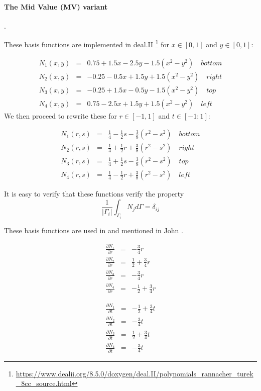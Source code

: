 \paragraph{The Mid Value (MV) variant}. 

These basis functions are implemented in deal.II
\footnote{\url{https://www.dealii.org/8.5.0/doxygen/deal.II/polynomials_rannacher_turek_8cc_source.html}}
for $x\in[0,1]$ and $y\in[0,1]$:

\begin{eqnarray}
N_1(x,y) &=&  0.75 + 1.5x - 2.5y -1.5(x^2-y^2) \quad bottom\\
N_2(x,y) &=& -0.25 - 0.5x + 1.5y +1.5(x^2-y^2) \quad right\\
N_3(x,y) &=& -0.25 + 1.5x - 0.5y -1.5(x^2-y^2) \quad top\\
N_4(x,y) &=&  0.75 - 2.5x + 1.5y +1.5(x^2-y^2) \quad left
\end{eqnarray}
We then proceed to rewrite these for $r\in[-1,1]$ and $t\in[-1:1]$:
\begin{mdframed}[backgroundcolor=blue!5]
\begin{eqnarray}
N_1(r,s) &=& \frac{1}{4} -\frac{1}{2}s - \frac{3}{8}(r^2-s^2) \quad bottom \\
N_2(r,s) &=& \frac{1}{4} +\frac{1}{2}r + \frac{3}{8}(r^2-s^2) \quad right \\
N_3(r,s) &=& \frac{1}{4} +\frac{1}{2}s - \frac{3}{8}(r^2-s^2) \quad top \\
N_4(r,s) &=& \frac{1}{4} -\frac{1}{2}r + \frac{3}{8}(r^2-s^2) \quad left
\end{eqnarray}
\end{mdframed}
It is easy to verify that these functions verify the property
\[
\frac{1}{|\Gamma_i|} \int_{\Gamma_i} N_j d\Gamma = \delta_{ij}
\]

These basis functions are used in \cite{shzh06} and mentioned in John \cite[p.722]{john16}.

\begin{eqnarray}
\frac{\partial N_1}{\partial r} &=& -\frac{3}{4}r \nonumber\\
\frac{\partial N_2}{\partial r} &=& \frac{1}{2}+\frac{3}{4}r \nonumber\\
\frac{\partial N_3}{\partial r} &=& -\frac{3}{4}r \nonumber\\
\frac{\partial N_4}{\partial r} &=& -\frac{1}{2}+\frac{3}{4}r \nonumber
\end{eqnarray}

\begin{eqnarray}
\frac{\partial N_1}{\partial t} &=& -\frac{1}{2}+\frac{3}{4}t \nonumber\\
\frac{\partial N_2}{\partial t} &=& -\frac{3}{4}t \nonumber\\
\frac{\partial N_3}{\partial t} &=& \frac{1}{2}+\frac{3}{4}t \nonumber\\
\frac{\partial N_4}{\partial t} &=& -\frac{3}{4}t \nonumber
\end{eqnarray}


